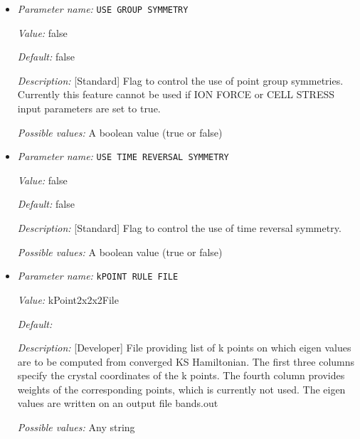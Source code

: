 \begin{itemize}
\item {\it Parameter name:} {\tt USE GROUP SYMMETRY}
\label{parameters:Brillouin zone k point sampling options/USE GROUP SYMMETRY}
\label{parameters:Brillouin_20zone_20k_20point_20sampling_20options/USE_20GROUP_20SYMMETRY}


{\it Value:} false


{\it Default:} false


{\it Description:} [Standard] Flag to control the use of point group symmetries. Currently this feature cannot be used if ION FORCE or CELL STRESS input parameters are set to true.


{\it Possible values:} A boolean value (true or false)
\item {\it Parameter name:} {\tt USE TIME REVERSAL SYMMETRY}
\label{parameters:Brillouin zone k point sampling options/USE TIME REVERSAL SYMMETRY}
\label{parameters:Brillouin_20zone_20k_20point_20sampling_20options/USE_20TIME_20REVERSAL_20SYMMETRY}


{\it Value:} false


{\it Default:} false


{\it Description:} [Standard] Flag to control the use of time reversal symmetry.


{\it Possible values:} A boolean value (true or false)
\item {\it Parameter name:} {\tt kPOINT RULE FILE}
\label{parameters:Brillouin zone k point sampling options/kPOINT RULE FILE}
\label{parameters:Brillouin_20zone_20k_20point_20sampling_20options/kPOINT_20RULE_20FILE}


{\it Value:} kPoint2x2x2File


{\it Default:} 


{\it Description:} [Developer] File providing list of k points on which eigen values are to be computed from converged KS Hamiltonian. The first three columns specify the crystal coordinates of the k points. The fourth column provides weights of the corresponding points, which is currently not used. The eigen values are written on an output file bands.out


{\it Possible values:} Any string
\end{itemize}



